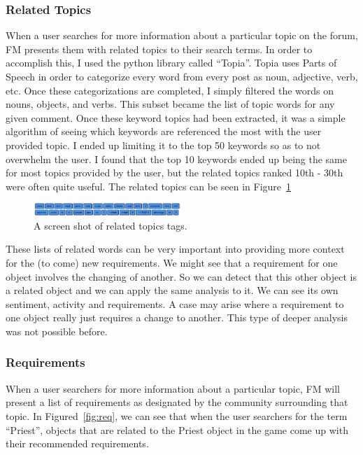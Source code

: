 \documentclass[conference]{IEEEtran}
\begin{document}
\subsubsection{Related Topics}

When a user searches for more information about a particular topic on the forum, FM presents them with related
topics to their search terms. In order to accomplish this, I used the python library called ``Topia''. Topia 
uses Parts of Speech in order to categorize every word from every post as noun, adjective, verb, etc. Once these
categorizations are completed, I simply filtered the words on nouns, objects, and verbs. This subset became the
list of topic words for any given comment. Once these keyword topics had been extracted, it was a simple algorithm
of seeing which keywords are referenced the most with the user provided topic. I ended up limiting it to the
top 50 keywords so as to not overwhelm the user. I found that the top 10 keywords ended up being the same for most
topics provided by the user, but the related topics ranked 10th - 30th were often quite useful. The related topics
can be seen in Figure~\ref{fig:rel}

\begin{figure}[h]
\centering
\includegraphics[width=0.5\textwidth]{images/rel.png}
\caption{A screen shot of related topics tags.\label{fig:rel}}
\end{figure}

These lists of related words can be very important into providing more context for the (to come) new requirements.
We might see that a requirement for one object involves the changing of another. So we can detect that this other
object is a related object and we can apply the same analysis to it. We can see its own sentiment, activity and
requirements. A case may arise where a requirement to one object really just requires a change to another. This
type of deeper analysis was not possible before.

\subsubsection{Requirements}

When a user searchers for more information about a particular topic, FM will present a list of requirements
as designated by the community surrounding that topic. In Figured~\ref{fig:req}, we can see that when
the user searchers for the term ``Priest'', objects that are related to the Priest object in the game come up
with their recommended requirements.
\end{document}
